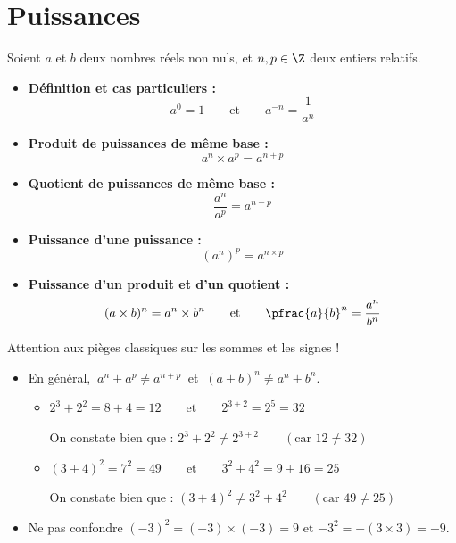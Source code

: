 \section{Puissances}

\begin{prop}
	Soient $a$ et $b$ deux nombres réels non nuls, et $n, p \in \Z$ deux entiers relatifs.

	\begin{itemize}
		\item \textbf{Définition et cas particuliers :}
		      \[
			      a^0 = 1 \qquad \text{et} \qquad a^{-n} = \frac{1}{a^n}
		      \]

		\item \textbf{Produit de puissances de même base :}
		      \[
			      a^n \times a^p = a^{n+p}
		      \]

		\item \textbf{Quotient de puissances de même base :}
		      \[
			      \frac{a^n}{a^p} = a^{n-p}
		      \]

		\item \textbf{Puissance d'une puissance :}
		      \[
			      \left( a^n \right)^p = a^{n \times p}
		      \]

		\item \textbf{Puissance d'un produit et d'un quotient :}
		      \[
			      (a \times b)^n = a^n \times b^n \qquad \text{et} \qquad \pfrac{a}{b}^n = \frac{a^n}{b^n}
		      \]
	\end{itemize}
\end{prop}

\begin{attention}
	Attention aux pièges classiques sur les sommes et les signes !
	\begin{itemize}
		\item En général, $\ a^n + a^p \neq a^{n+p}\ $ et $\ (a + b)^n \neq a^n + b^n$.
		      \begin{itemize}
			      \item $2^3 + 2^2 = 8 + 4 = 12 \qquad \text{et} \qquad 2^{3+2} = 2^5 = 32$

			            On constate bien que : $2^3 + 2^2 \neq 2^{3+2} \qquad (\text{car } 12 \neq 32)$
			      \item $(3 + 4)^2 = 7^2 = 49 \qquad \text{et} \qquad 3^2 + 4^2 = 9 + 16 = 25$

			            On constate bien que : $(3 + 4)^2 \neq 3^2 + 4^2 \qquad (\text{car } 49 \neq 25)$
		      \end{itemize}
		\item Ne pas confondre $(-3)^2 = (-3) \times (-3) = 9$ et $-3^2 = -(3 \times 3) = -9$.
	\end{itemize}
\end{attention}

